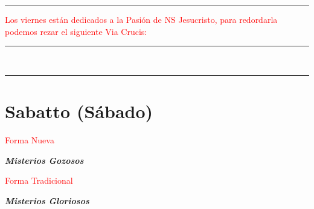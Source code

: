 \documentclass[10pt,twoside]{book}
\begin{document}




\vspace{0.75em}



{}

\iralfinal

\begin{center}
      {\rule{10em}{0.4pt}}

      \vspace{0.75em}

      \textcolor{red}{Los viernes están dedicados a la Pasión de NS Jesucristo, para redordarla podemos rezar el siguiente Via Crucis\cite{sanchez-ruiz}:}
\end{center}

\begin{multicols}{2}

      

\end{multicols}

\begin{center}
      \begin{spacing}{0.25}
            {\rule{20em}{0.4pt}}\\
            {\rule{20em}{0.4pt}}
      \end{spacing}
\end{center}



\section*{\centering Sabatto (Sábado)}

\begin{paracol}{2}
      \begin{leftcolumn}
            \begin{center}
                  \textcolor{red}{Forma Nueva}

                  \textbf{\textsl{Misterios Gozosos}}
            \end{center}
             
            
      \end{leftcolumn}
      \begin{rightcolumn}
            \begin{center}
                  \textcolor{red}{Forma Tradicional}

                  \textbf{\textsl{Misterios Gloriosos}}
            \end{center}                  
                  
            
      \end{rightcolumn}
\end{paracol}
\end{document}
